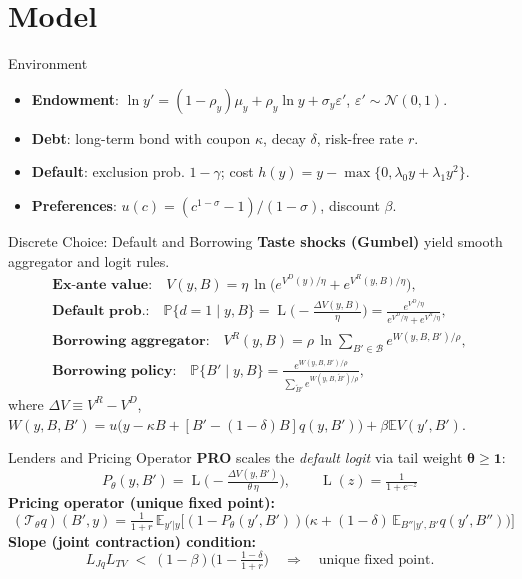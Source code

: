 \documentclass[aspectratio=169,11pt,professionalfonts]{beamer}
\newcommand{\E}{\mathbb{E}}
\newcommand{\bbP}{\mathbb{P}}
\newcommand{\1}{\mathbb{1}}
\DeclareMathOperator{\Lsig}{L}
\begin{document}
\section{Model}

\begin{frame}{Environment}
  \begin{itemize}
    \item \textbf{Endowment}: $\ln y'=(1-\rho_y)\mu_y+\rho_y\ln y+\sigma_y\varepsilon'$, $\varepsilon'\sim\mathcal N(0,1)$.
    \item \textbf{Debt}: long-term bond with coupon $\kappa$, decay $\delta$, risk-free rate $r$.
    \item \textbf{Default}: exclusion prob. $1-\gamma$; cost $h(y)=y-\max\{0,\lambda_0 y+\lambda_1 y^2\}$.
    \item \textbf{Preferences}: $u(c)=(c^{1-\sigma}-1)/(1-\sigma)$, discount $\beta$.
  \end{itemize}
\end{frame}

\begin{frame}{Discrete Choice: Default and Borrowing}
  \textbf{Taste shocks (Gumbel)} yield smooth aggregator and logit rules.
  \begin{gather*}
    \textbf{Ex-ante value:}\quad V(y,B)=\eta\,\ln\!\Big( e^{V^D(y)/\eta}+e^{V^R(y,B)/\eta}\Big),\\
    \textbf{Default prob.:}\quad \bbP\{d{=}1\mid y,B\}=\Lsig\!\Big(-\tfrac{\Delta V(y,B)}{\eta}\Big)=\tfrac{e^{V^D/\eta}}{e^{V^D/\eta}+e^{V^R/\eta}},\\
    \textbf{Borrowing aggregator:}\quad V^R(y,B)=\rho\,\ln\!\sum_{B'\in\mathcal B} e^{W(y,B,B')/\rho},\\
    \textbf{Borrowing policy:}\quad \bbP\{B'\mid y,B\}=\frac{e^{W(y,B,B')/\rho}}{\sum_{\tilde B'} e^{W(y,B,\tilde B')/\rho}},
  \end{gather*}
  \vspace{-0.5em}
  where $\Delta V\equiv V^R{-}V^D$, $W(y,B,B')=u\big(y-\kappa B+[B'-(1{-}\delta)B]q(y,B')\big)+\beta\E V(y',B')$.
\end{frame}

\begin{frame}{Lenders and Pricing Operator}
  \textbf{PRO} scales the \emph{default logit} via tail weight $\bm{\theta\ge1}$:
  \begin{equation*}
    \boxed{\;P_\theta(y,B')=\Lsig\!\Big(-\tfrac{\Delta V(y,B')}{\theta\,\eta}\Big),\qquad \Lsig(z)=\tfrac{1}{1+e^{-z}}\;}
  \end{equation*}
  \textbf{Pricing operator (unique fixed point):}
  \begin{equation*}
    \boxed{\;(\mathcal T_\theta q)(B',y)=\tfrac{1}{1+r}\,\E_{y'|y}\!\Big[(1{-}P_\theta(y',B'))\big(\kappa+(1{-}\delta)\,\E_{B''|y',B'}q(y',B'')\big)\Big]\;}
  \end{equation*}
  \textbf{Slope (joint contraction) condition:}
  \begin{equation*}
    L_{Jq}L_{TV}\;<\;(1-\beta)\Big(1-\tfrac{1-\delta}{1+r}\Big)\quad\Rightarrow\quad \text{unique fixed point.}
  \end{equation*}
  
\end{frame}
\end{document}
